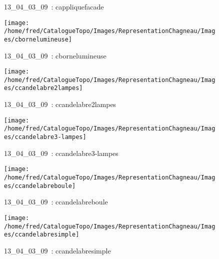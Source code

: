 \documentclass[12pt,titlepage]{book}
\begin{document}
\begin{figure}[h!]
\begin{minipage}[t]{3cm}
\begin{center}
      \caption[~13\_04\_03\_09]{\small{13\_04\_03\_09~:} \tiny{cappliquefacade}}\label{cappliquefacade}
    \end{center}
  \end{minipage}
  \begin{minipage}[t]{3cm}
    \begin{center}
      \texttt{[image: /home/fred/CatalogueTopo/Images/RepresentationChagneau/Images/cbornelumineuse]}
      \caption[~13\_04\_03\_09]{\small{13\_04\_03\_09~:} \tiny{cbornelumineuse}}\label{cbornelumineuse}
    \end{center}
  \end{minipage}
  \begin{minipage}[t]{3cm}
    \begin{center}
      \texttt{[image: /home/fred/CatalogueTopo/Images/RepresentationChagneau/Images/ccandelabre2lampes]}
      \caption[~13\_04\_03\_09]{\small{13\_04\_03\_09~:} \tiny{ccandelabre2lampes}}\label{ccandelabre2lampes}
    \end{center}
  \end{minipage}
  \begin{minipage}[t]{3cm}
    \begin{center}
      \texttt{[image: /home/fred/CatalogueTopo/Images/RepresentationChagneau/Images/ccandelabre3-lampes]}
      \caption[~13\_04\_03\_09]{\small{13\_04\_03\_09~:} \tiny{ccandelabre3-lampes}}\label{ccandelabre3-lampes}
    \end{center}
  \end{minipage}
  \begin{minipage}[t]{3cm}
    \begin{center}
      \texttt{[image: /home/fred/CatalogueTopo/Images/RepresentationChagneau/Images/ccandelabreboule]}
      \caption[~13\_04\_03\_09]{\small{13\_04\_03\_09~:} \tiny{ccandelabreboule}}\label{ccandelabreboule}
    \end{center}
  \end{minipage}
  \begin{minipage}[t]{3cm}
    \begin{center}
      \texttt{[image: /home/fred/CatalogueTopo/Images/RepresentationChagneau/Images/ccandelabresimple]}
      \caption[~13\_04\_03\_09]{\small{13\_04\_03\_09~:} \tiny{ccandelabresimple}}\label{ccandelabresimple}

\end{center}
\end{minipage}
\end{figure}
\end{document}
